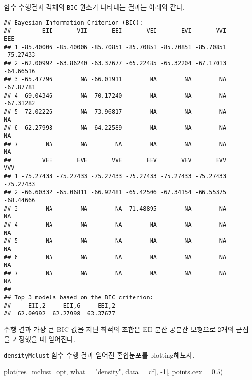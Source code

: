 \documentclass[
]{book}
\newenvironment{Shaded}{\begin{snugshade}}{\end{snugshade}}
\newcommand{\AttributeTok}[1]{\textcolor[rgb]{0.77,0.63,0.00}{#1}}
\newcommand{\DecValTok}[1]{\textcolor[rgb]{0.00,0.00,0.81}{#1}}
\newcommand{\FloatTok}[1]{\textcolor[rgb]{0.00,0.00,0.81}{#1}}
\newcommand{\FunctionTok}[1]{\textcolor[rgb]{0.00,0.00,0.00}{#1}}
\newcommand{\NormalTok}[1]{#1}
\newcommand{\SpecialCharTok}[1]{\textcolor[rgb]{0.00,0.00,0.00}{#1}}
\newcommand{\StringTok}[1]{\textcolor[rgb]{0.31,0.60,0.02}{#1}}
\begin{document}
함수 수행결과 객체의 \texttt{BIC} 원소가 나타내는 결과는 아래와 같다.

\begin{Shaded}
\end{Shaded}

\begin{verbatim}
## Bayesian Information Criterion (BIC): 
##         EII       VII       EEI       VEI       EVI       VVI       EEE
## 1 -85.40006 -85.40006 -85.70851 -85.70851 -85.70851 -85.70851 -75.27433
## 2 -62.00992 -63.86240 -63.37677 -65.22485 -65.32204 -67.17013 -64.66516
## 3 -65.47796        NA -66.01911        NA        NA        NA -67.87781
## 4 -69.04346        NA -70.17240        NA        NA        NA -67.31282
## 5 -72.02226        NA -73.96817        NA        NA        NA        NA
## 6 -62.27998        NA -64.22589        NA        NA        NA        NA
## 7        NA        NA        NA        NA        NA        NA        NA
##         VEE       EVE       VVE       EEV       VEV       EVV       VVV
## 1 -75.27433 -75.27433 -75.27433 -75.27433 -75.27433 -75.27433 -75.27433
## 2 -66.60332 -65.06811 -66.92481 -65.42506 -67.34154 -66.55375 -68.44666
## 3        NA        NA        NA -71.48895        NA        NA        NA
## 4        NA        NA        NA        NA        NA        NA        NA
## 5        NA        NA        NA        NA        NA        NA        NA
## 6        NA        NA        NA        NA        NA        NA        NA
## 7        NA        NA        NA        NA        NA        NA        NA
## 
## Top 3 models based on the BIC criterion: 
##     EII,2     EII,6     EEI,2 
## -62.00992 -62.27998 -63.37677
\end{verbatim}

수행 결과 가장 큰 BIC 값을 지닌 최적의 조합은 EII 분산-공분산 모형으로 2개의 군집을 가정했을 때 얻어진다.

\texttt{densityMclust} 함수 수행 결과 얻어진 혼합분포를 plotting해보자.

\begin{Shaded}
\begin{Highlighting}[]
\FunctionTok{plot}\NormalTok{(res\_mclust\_opt, }\AttributeTok{what =} \StringTok{"density"}\NormalTok{,}
     \AttributeTok{data =}\NormalTok{ df[, }\SpecialCharTok{{-}}\DecValTok{1}\NormalTok{], }\AttributeTok{points.cex =} \FloatTok{0.5}\NormalTok{)}
\end{Highlighting}
\end{Shaded}
\end{document}

